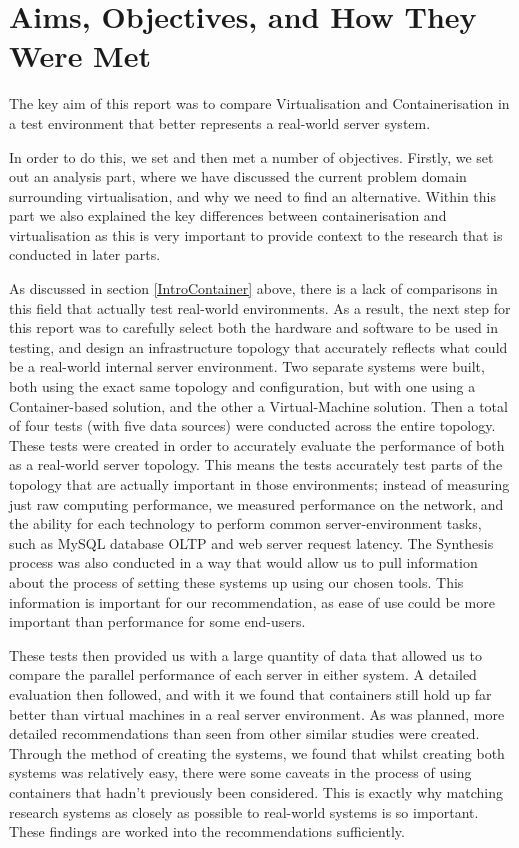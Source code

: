 \section{Aims, Objectives, and How They Were Met}
The key aim of this report was to compare Virtualisation and Containerisation in a test environment that better represents a real-world server system.

 In order to do this, we set and then met a number of objectives. Firstly, we set out an analysis part, where we have discussed the current problem domain surrounding virtualisation, and why we need to find an alternative. Within this part we also explained the key differences between containerisation and virtualisation as this is very important to provide context to the research that is conducted in later parts.

As discussed in section \ref{IntroContainer} above, there is a lack of comparisons in this field that actually test real-world environments. As a result, the next step for this report was to carefully select both the hardware and software to be used in testing, and design an infrastructure topology that accurately reflects what could be a real-world internal server environment. Two separate systems were built, both using the exact same topology and configuration, but with one using a Container-based solution, and the other a Virtual-Machine solution. Then a total of four tests (with five data sources) were conducted across the entire topology. These tests were created in order to accurately evaluate the performance of both as a real-world server topology. This means the tests accurately test parts of the topology that are actually important in those environments; instead of measuring just raw computing performance, we measured performance on the network, and the ability for each technology to perform common server-environment tasks, such as MySQL database OLTP \citep{oltpbenchmarking} and web server request latency. The Synthesis process was also conducted in a way that would allow us to pull information about the process of setting these systems up using our chosen tools. This information is important for our recommendation, as ease of use could be more important than performance for some end-users.

These tests then provided us with a large quantity of data that allowed us to compare the parallel performance of each server in either system. A detailed evaluation then followed, and with it we found that containers still hold up far better than virtual machines in a real server environment. As was planned, more detailed recommendations than seen from other similar studies were created. Through the method of creating the systems, we found that whilst creating both systems was relatively easy, there were some caveats in the process of using containers that hadn't previously been considered. This is exactly why matching research systems as closely as possible to real-world systems is so important. These findings are worked into the recommendations sufficiently.


